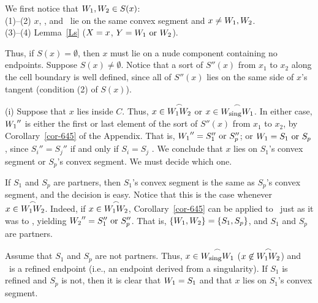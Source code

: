 We first notice that $\mbox{$W_{1}$},\mbox{$W_{2}$} \in S(x)$:\\
\indent (1)--(2) $x$, \wo, and \wt\ lie on the same convex segment and $x \neq \mbox{$W_{1}$},\mbox{$W_{2}$}$.\\
\indent (3)--(4) Lemma~\ref{Ls} ($X = x$, $Y = \mbox{$W_{1}$} \mbox{ or } \mbox{$W_{2}$}$).

\noindent Thus, if $S(x) = \emptyset$, then $x$ must lie on a nude component containing 
no endpoints.
%
%
Suppose $S(x) \neq \emptyset$.
Notice that a sort of $S''(x)$ 
from $x_{1}$ to $x_{2}$ along the cell boundary is well defined, 
since all of $S''(x)$ lies on the same side of $x$'s tangent
(condition (2) of $S(x)$).

(i) Suppose that $x$ lies inside $C$.
Thus, $x \in \mbox{$\stackrel{\frown}{\mbox{$W_{1}$}\mbox{$W_{2}$}}$}$ or $x \in \mbox{$\stackrel{\frown}{W_{\mbox{\footnotesize{sing}}}\mbox{$W_{1}$}}$}$.
In either case, 
$\mbox{$W_{1}$}''$ is either the first or last element of the sort of $S''(x)$
from $x_{1}$ to $x_{2}$, by Corollary~\ref{cor-645} of the Appendix.
That is, $\mbox{$W_{1}$}'' = S_{1}'' \mbox{ or } S_{p}''$; or
$\mbox{$W_{1}$} = S_{1} \mbox{ or } S_{p}$, 
since $S_{i}'' = S_{j}''$ if and only if $S_{i}=S_{j}$ \cite[p. 75]{jj}.
We conclude that $x$ lies on $S_{1}$'s convex segment or 
$S_{p}$'s convex segment.
We must decide which one.

If $S_{1}$ and $S_{p}$ are partners, then $S_{1}$'s convex segment is the same as
$S_{p}$'s convex segment, and the decision is easy.
Notice that this is the case whenever $x \in \mbox{$\stackrel{\frown}{\mbox{$W_{1}$}\mbox{$W_{2}$}}$}$.
Indeed, if $x \in \mbox{$\stackrel{\frown}{\mbox{$W_{1}$}\mbox{$W_{2}$}}$}$,
Corollary~\ref{cor-645} can be applied to \wt\ just as it was to \wo, yielding
$\mbox{$W_{2}$}'' = S_{1}'' \mbox{ or } S_{p}''$.
That is, $\{\mbox{$W_{1}$},\mbox{$W_{2}$}\} = \{S_{1},S_{p}\}$, and $S_{1}$ and $S_{p}$ are partners.

Assume that $S_{1}$ and $S_{p}$ are not partners.
Thus, $x \in \mbox{$\stackrel{\frown}{W_{\mbox{\footnotesize{sing}}}\mbox{$W_{1}$}}$}$ ($x \not\in \mbox{$\stackrel{\frown}{\mbox{$W_{1}$}\mbox{$W_{2}$}}$}$)
and  \wo\ is a refined endpoint (i.e., an endpoint derived from a singularity).
If $S_{1}$ is refined and $S_{p}$ is not, then it is clear that $\mbox{$W_{1}$} = S_{1}$ and that
$x$ lies on $S_{1}$'s convex segment.

